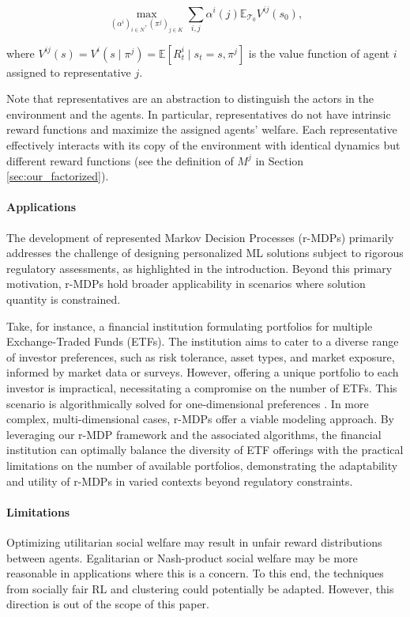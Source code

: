 \documentclass[letterpaper]{article} %
\begin{document}
\begin{equation}\label{eq:objective_joint}
    \max_{(\alpha^i)_{i \in N}, (\pi^{j})_{j \in K}} \sum_{i, j} \alpha^i(j) \mathbb{E}_{\mathcal{T}_0} V^{ij}(s_0),
\end{equation}

\noindent where $V^{ij}(s) = V^i(s \mid \pi^j) = \mathbb{E} [ R_t^i \mid s_t = s, \pi^j ]$ is the value function of agent $i$ assigned to representative $j$.

Note that representatives are an abstraction to distinguish the actors in the environment and the agents. In particular, representatives do not have intrinsic reward functions and maximize the assigned agents' welfare. Each representative effectively interacts with its copy of the environment with identical dynamics but different reward functions (see the definition of $M^j$ in Section \ref{sec:our_factorized}). 

\paragraph{Applications} The development of represented Markov Decision Processes (r-MDPs) primarily addresses the challenge of designing personalized ML solutions subject to rigorous regulatory assessments, as highlighted in the introduction. Beyond this primary motivation, r-MDPs hold broader applicability in scenarios where solution quantity is constrained.

Take, for instance, a financial institution formulating portfolios for multiple Exchange-Traded Funds (ETFs). The institution aims to cater to a diverse range of investor preferences, such as risk tolerance, asset types, and market exposure, informed by market data or surveys. However, offering a unique portfolio to each investor is impractical, necessitating a compromise on the number of ETFs. This scenario is algorithmically solved for one-dimensional preferences \cite{diana2021algorithms}. In more complex, multi-dimensional cases, r-MDPs offer a viable modeling approach. By leveraging our r-MDP framework and the associated algorithms, the financial institution can optimally balance the diversity of ETF offerings with the practical limitations on the number of available portfolios, demonstrating the adaptability and utility of r-MDPs in varied contexts beyond regulatory constraints.

\paragraph{Limitations} Optimizing utilitarian social welfare may result in unfair reward distributions between agents. Egalitarian or Nash-product social welfare may be more reasonable in applications where this is a concern. To this end, the techniques from socially fair RL \cite{mandal2022socially} and clustering \cite{kar2023feature} could potentially be adapted. However, this direction is out of the scope of this paper.
\end{document}
